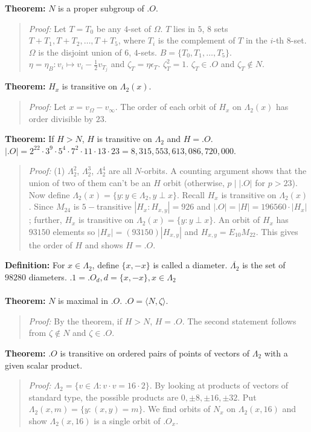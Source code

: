 {\bf Theorem:}
$N$ is a proper subgroup of $.O$.
\begin{quote}
\emph{Proof:} 
Let $T=T_0$ be any $4$-set of $\Omega$.  $T$ lies in $5$, $8$ sets
$ T+T_1, T+T_2, \ldots, T+T_5$, where $T_i$ is the complement of
$T$ in the $i$-th $8$-set.  $\Omega$ is the disjoint union of
$6$, $4$-sets.  $B= \{ T_0 , T_1 , \ldots , T_5 \}$.
$\eta= \eta_B: v_i \mapsto v_i- {\frac 1 2} v_{T_j}$ and
$\zeta_T= \eta \epsilon_T$.  $\zeta_T^2=1$.  $\zeta_T \in .O$ and
$\zeta_T \notin N$.
\end{quote}
{\bf Theorem:}
$H_x$ is transitive on $\Lambda_2(x)$.
\begin{quote}
\emph{Proof:} 
Let $x= v_{\Omega}- v_{\infty}$.  The order of each orbit of $H_x$ on $\Lambda_2(x)$
has order divisible by $23$.
\end{quote}
{\bf Theorem:}
If $H>N$, $H$ is transitive on $\Lambda_2$ and $H=.O$.  $|.O|=
2^{22} \cdot 3^{9} \cdot 5^4 \cdot 7^2 \cdot 11 \cdot 13 \cdot 23= 8,315,553,613,086,720,000$.
\begin{quote}
\emph{Proof:} 
(1) $\Lambda_2^2$, $\Lambda_2^3$, $\Lambda_2^4$ are all $N$-orbits.  
A counting argument shows that the union of two
of them can't be an $H$ orbit (otherwise, $p \mid |.O|$ for $p>23$).  Now define
$\Lambda_2 (x)= \{ y: y \in \Lambda_2, y \perp x \}$.
Recall $H_x$ is transitive on $\Lambda_2(x)$.
Since $M_{24}$ is $5-$transitive $|H_x : H_{x,y}|= 926$ and
$|.O|= |H| = 196560 \cdot |H_x|$; further,  $H_x$ is transitive on 
$\Lambda_2 (x)= \{ y: y \perp x \}$.  An orbit of $H_x$ has $93150$ elements so
$|H_x|= (93150) |H_{x,y}|$ and $H_{x,y} = E_{10} M_{22}$.  This gives the order of
$H$ and shows $H=.O$.
\end{quote}
{\bf Definition:}
For $x \in \Lambda_2$, define $\{ x , -x \}$ is called a diameter.
${\overline {\Lambda_2}}$ is the set of $98280$ diameters.
$.1= .O_d, d= \{x, -x \}, x \in \Lambda_2$ 
\\
\\
{\bf Theorem:} $N$ is maximal in $.O$.  $.O= \langle N, \zeta \rangle$.
\begin{quote}
\emph{Proof:} 
By the theorem, if $H>N$, $H=.O$.  The second statement follows from $\zeta \notin N$ and $\zeta \in .O$.
\end{quote}
{\bf Theorem:} 
$.O$ is transitive on ordered pairs of points of vectors of $\Lambda_2$ with a
given scalar product.
\begin{quote}
\emph{Proof:} 
$\Lambda_2= \{ v \in \Lambda: v \cdot v= 16 \cdot 2 \}$.  By looking at products of
vectors of standard type, the possible products are
$0, \pm 8, \pm 16, \pm 32$.  Put $\Lambda_2(x,m)= \{y: (x,y)= m \}$.
We find orbits of $N_x$ on $\Lambda_2(x,16)$ and show 
$\Lambda_2(x,16)$ is a single orbit of $.O_x$.
\end{quote}
